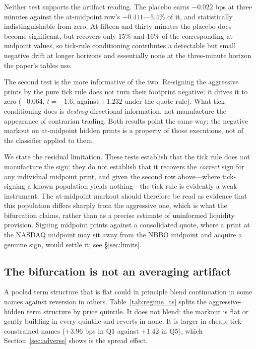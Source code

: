 \documentclass[11pt]{article}
\begin{document}
Neither test supports the artifact reading. The placebo earns $-0.022$ bps at three minutes
against the at-midpoint row's $-0.411$---$5.4\%$ of it, and statistically indistinguishable
from zero. At fifteen and thirty minutes the placebo does become significant, but recovers
only $15\%$ and $16\%$ of the corresponding at-midpoint values, so tick-rule conditioning
contributes a detectable but small negative drift at longer horizons and essentially none at
the three-minute horizon the paper's tables use.

The second test is the more informative of the two. Re-signing the aggressive prints by the
pure tick rule does not turn their footprint negative; it drives it to zero
($-0.064$, $t=-1.6$, against $+1.232$ under the quote rule). What tick conditioning does is
\emph{destroy} directional information, not manufacture the appearance of contrarian
trading. Both results point the same way: the negative markout on at-midpoint hidden prints
is a property of those executions, not of the classifier applied to them.

We state the residual limitation. These tests establish that the tick rule does not
manufacture the sign; they do not establish that it recovers the \emph{correct} sign for any
individual midpoint print, and given the second row above---where tick-signing a known
population yields nothing---the tick rule is evidently a weak instrument. The at-midpoint
markout should therefore be read as evidence that this population differs sharply from the
aggressive one, which is what the bifurcation claims, rather than as a precise estimate of
uninformed liquidity provision. Signing midpoint prints against a consolidated quote, where
a print at the NASDAQ midpoint may sit away from the NBBO midpoint and acquire a genuine
sign, would settle it; see \S\ref{sec:limits}.

\subsection{The bifurcation is not an averaging artifact}

A pooled term structure that is flat could in principle blend continuation in some names
against reversion in others. Table~\ref{tab:regime_ts} splits the aggressive-hidden term
structure by price quintile. It does not blend: the markout is flat or gently building in
every quintile and reverts in none. It is larger in cheap, tick-constrained names ($+3.96$
bps in Q1 against $+1.42$ in Q5), which Section~\ref{sec:adverse} shows is the spread
effect.
\end{document}
